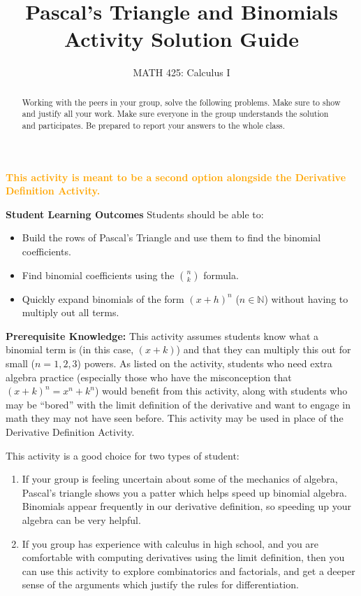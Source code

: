 \documentclass{ximera}
\title{Pascal's Triangle and Binomials Activity Solution Guide}
\author{MATH 425: Calculus I}
\begin{document}
\begin{abstract}
   Working with the peers in your group, solve the following problems. Make sure to show and justify all your work. Make sure everyone in the group understands the solution and participates. Be prepared to report your answers to the whole class. 
\end{abstract}
\maketitle

\textcolor{orange}{\textbf{This activity is meant to be a second option alongside the Derivative Definition Activity.}}

\textbf{Student Learning Outcomes}
Students should be able to:
    \begin{itemize}
        \item Build the rows of Pascal's Triangle and use them to find the binomial coefficients.
        \item Find binomial coefficients using the ${n\choose k}$ formula.
        \item Quickly expand binomials of the form $(x+h)^n$ ($n\in \mathbb{N}$) without having to multiply out all terms.
    \end{itemize}

\textbf{Prerequisite Knowledge:} This activity assumes students know what a binomial term is (in this case, $(x+k)$) and that they can multiply this out for small ($n=1,2,3$) powers.  As listed on the activity, students who need extra algebra practice (especially those who have the misconception that $(x+k)^n=x^n+k^n$) would benefit from this activity, along with students who may be ``bored'' with the limit definition of the derivative and want to engage in math they may not have seen before. This activity may be used in place of the Derivative Definition Activity.  

This activity is a good choice for two types of student: 
\begin{enumerate}
    \item If your group is feeling uncertain about some of the mechanics of algebra, Pascal's triangle shows you a patter which helps speed up binomial algebra.  Binomials appear frequently in our derivative definition, so speeding up your algebra can be very helpful.
    \item If you group has experience with calculus in high school, and you are comfortable with computing derivatives using the limit definition, then you can use this activity to explore combinatorics and factorials, and get a deeper sense of the arguments which justify the rules for differentiation.
\end{enumerate}
\end{document}
